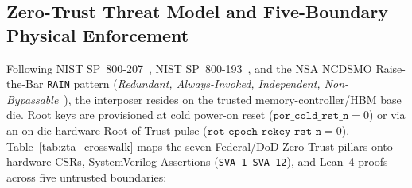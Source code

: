\documentclass[11pt,letterpaper]{article}
\theoremstyle{spectralthm}
\begin{document}
\subsection{Zero-Trust Threat Model and Five-Boundary Physical Enforcement}
\label{sec:zta_threat}
Following NIST SP~800-207~\cite{rose2020zta}, NIST SP~800-193~\cite{regenscheid2018pfr}, and the NSA NCDSMO Raise-the-Bar \texttt{RAIN} pattern (\textit{Redundant, Always-Invoked, Independent, Non-Bypassable}~\cite{mitra2000commonmode, ncdsmo2020rain}), the interposer resides on the trusted memory-controller/HBM base die. Root keys are provisioned at cold power-on reset ($\texttt{por\_cold\_rst\_n} = 0$) or via an on-die hardware Root-of-Trust pulse ($\texttt{rot\_epoch\_rekey\_rst\_n} = 0$). Table~\ref{tab:zta_crosswalk} maps the seven Federal/DoD Zero Trust pillars onto hardware CSRs, SystemVerilog Assertions (\texttt{SVA~1\textquotesingle}--\texttt{SVA 12}), and Lean~4 proofs across five untrusted boundaries:
\end{document}
